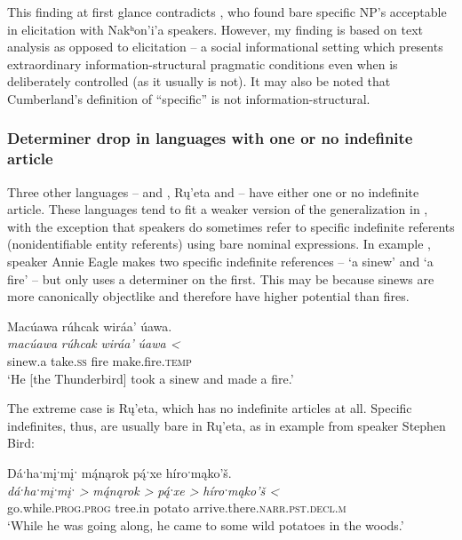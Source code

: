 \documentclass[output=paper]{LSP/langsci}
\begin{document}
This finding at first glance contradicts \citet{Cumberland2005}, who found bare specific NP’s acceptable in elicitation with Nakʰon’i’a speakers. However, my finding is based on text analysis as opposed to elicitation -- a social informational setting which presents extraordinary information-structural pragmatic conditions even when  is deliberately controlled (as it usually is not). It may also be noted that Cumberland’s definition of “specific” is not information-structural.

\subsubsection{Determiner drop in languages with one or no indefinite article}\label{droponeindef}

Three other languages --  and , Rų’eta and  -- have either one or no indefinite article. These languages tend to fit a weaker version of the generalization in , with the exception that speakers do sometimes refer to specific indefinite referents (nonidentifiable entity referents) using bare nominal expressions. In example ,  speaker Annie Eagle makes two specific indefinite references -- `a sinew' and `a fire' -- but only uses a determiner on the first. This may be because sinews are more canonically objectlike and therefore have higher  potential than fires.

\ea\label{eagledrop}
Macúawa rúhcak wiráa’ úawa.\footnotemark\\
\gll	\emph{macúawa} 	\emph{rúhcak} 	\emph{wiráa’}	\emph{úawa <}\\
	sinew.a 		take.\textsc{ss} 	fire 			make.fire.\textsc{temp}\\
\glt	`He [the Thunderbird] took a sinew and made a fire.'
\z

The extreme case is Rų’eta, which has no indefinite articles at all. Specific indefinites, thus, are usually bare in Rų’eta, as in example  from speaker Stephen Bird:

\ea\label{birddrop}
Dáˑhaˑmįˑmįˑ m\'{ą}nąrok p\'{ą}ˑxe híroˑmąko’š.\footnotemark\\
\gll	\emph{dáˑhaˑmįˑmįˑ >}		\emph{m\'{ą}nąrok >}	\emph{p\'{ą}ˑxe >}	\emph{híroˑmąko’š <}\\
	go.while.\textsc{prog.prog} 	tree.in 			potato 		arrive.there.\textsc{narr.pst.decl.m}\\
\glt	`While he was going along, he came to some wild potatoes in the woods.'
\z
\end{document}
